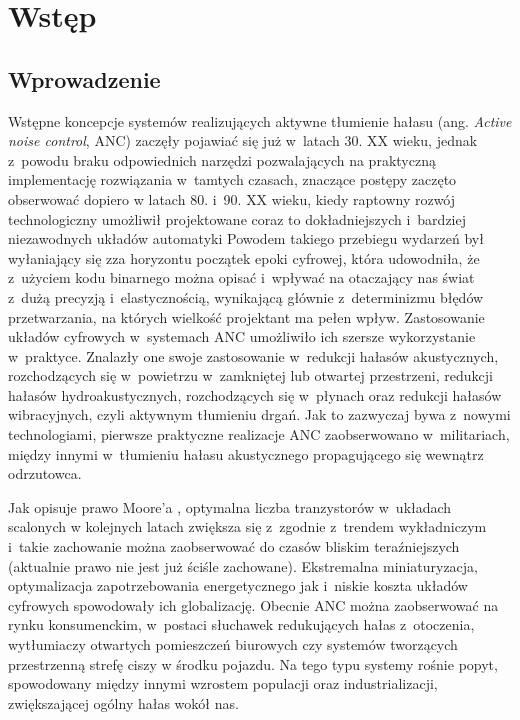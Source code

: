 \chapter{Wstęp}

\section{Wprowadzenie}

Wstępne koncepcje systemów realizujących aktywne tłumienie hałasu (ang.
\textit{Active noise control}, ANC) zaczęły pojawiać się już w~latach 30. XX
wieku, jednak z~powodu braku odpowiednich narzędzi pozwalających na praktyczną
implementację rozwiązania w~tamtych czasach, znaczące postępy zaczęto obserwować
dopiero w latach 80. i~90. XX wieku, kiedy raptowny rozwój technologiczny
umożliwił projektowane coraz to dokładniejszych i~bardziej niezawodnych układów
automatyki \cite{bib:kuo_morgan} Powodem takiego przebiegu wydarzeń był
wyłaniający się zza horyzontu początek epoki cyfrowej, która udowodniła, że
z~użyciem kodu binarnego można opisać i~wpływać na otaczający nas świat z~dużą
precyzją i~elastycznością, wynikającą głównie z~determinizmu błędów
przetwarzania, na których wielkość projektant ma pełen wpływ. Zastosowanie
układów cyfrowych w~systemach ANC umożliwiło ich szersze wykorzystanie
w~praktyce. Znalazły one swoje zastosowanie w~redukcji hałasów akustycznych,
rozchodzących się w~powietrzu w~zamkniętej lub otwartej przestrzeni, redukcji
hałasów hydroakustycznych, rozchodzących się w~płynach oraz redukcji hałasów
wibracyjnych, czyli aktywnym tłumieniu drgań. Jak to zazwyczaj bywa z~nowymi
technologiami, pierwsze praktyczne realizacje ANC zaobserwowano w~militariach,
między innymi w~tłumieniu hałasu akustycznego propagującego się wewnątrz
odrzutowca.

\par Jak opisuje prawo Moore'a \cite{bib:moore}, optymalna liczba tranzystorów
w~układach scalonych w kolejnych latach zwiększa się z~zgodnie z~trendem
wykładniczym i~takie zachowanie można zaobserwować do czasów bliskim
teraźniejszych (aktualnie prawo nie jest już ściśle zachowane). Ekstremalna
miniaturyzacja, optymalizacja zapotrzebowania energetycznego jak i~niskie koszta
układów cyfrowych spowodowały ich globalizację. Obecnie ANC można zaobserwować
na rynku konsumenckim, w~postaci słuchawek redukujących hałas z~otoczenia,
wytłumiaczy otwartych pomieszczeń biurowych czy systemów tworzących przestrzenną
strefę ciszy w środku pojazdu. Na tego typu systemy rośnie popyt, spowodowany
między innymi wzrostem populacji oraz industrializacji, zwiększającej ogólny
hałas wokół nas.


